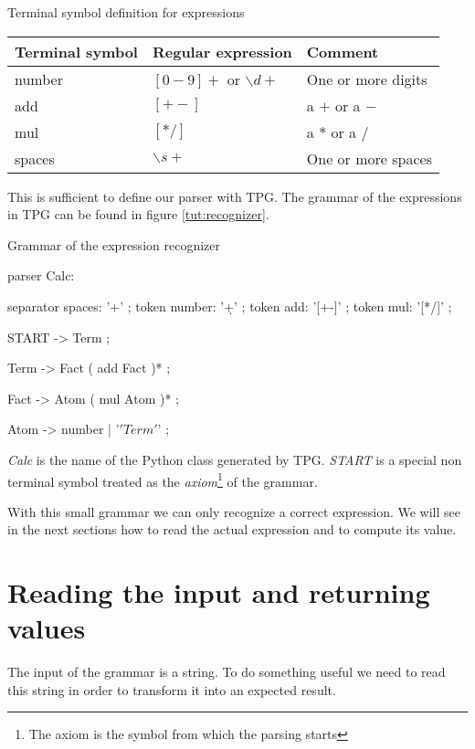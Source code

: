 \begin{tableau}
\caption{Terminal symbol definition for expressions}		\label{tut:token_calc}
\begin{tabular}{| l | l | l |}
\hline
	Terminal symbol & Regular expression & Comment \\
\hline
\hline
	number & $[0-9]+$ or $\backslash d+$ & One or more digits \\
\hline
	add & $[+-]$ & a $+$ or a $-$ \\
\hline
	mul & $[*/]$ & a $*$ or a $/$ \\
\hline
	spaces & $\backslash s+$ & One or more spaces \\
\hline
\end{tabular}
\end{tableau}

This is sufficient to define our parser with TPG. The grammar of the expressions in TPG can be found in figure \ref{tut:recognizer}.

\begin{code}
\caption{Grammar of the expression recognizer}				\label{tut:recognizer}
\begin{verbatimtab}[4]
parser Calc:

	separator spaces: '\s+' ;
	token number: '\d+' ;
	token add: '[+-]' ;
	token mul: '[*/]' ;

	START -> Term ;

	Term -> Fact ( add Fact )* ;

	Fact -> Atom ( mul Atom )* ;

	Atom -> number | '\(' Term '\)' ;
\end{verbatimtab}
\end{code}

\emph{Calc} is the name of the Python class generated by TPG. \emph{START} is a special non terminal symbol treated as the \emph{axiom}\footnote{The axiom is the symbol from which the parsing starts} of the grammar.

With this small grammar we can only recognize a correct expression. We will see in the next sections how to read the actual expression and to compute its value.

\section{Reading the input and returning values}

The input of the grammar is a string. To do something useful we need to read this string in order to transform it into an expected result.

